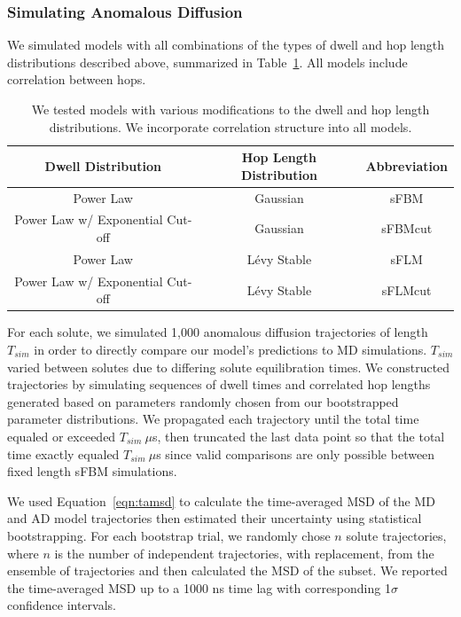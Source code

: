 \documentclass[aps,pre,preprint,groupedaddress]{revtex4-2}
\begin{document}
  \subsubsection*{Simulating Anomalous Diffusion}

  We simulated models with all combinations of the types of dwell and hop length
  distributions described above, summarized in Table~\ref{table:anomalous_models}.
  All models include correlation between hops.

  \begin{table}[!htb]
	  \centering
	  \begin{tabular}{|c|c|c|}
	  \hline
	  Dwell Distribution                & Hop Length Distribution & Abbreviation \\
	  \hline
      Power Law                         & Gaussian                & sFBM         \\
      Power Law w/ Exponential Cut-off  & Gaussian                & sFBMcut      \\
      Power Law                         & L\'evy Stable           & sFLM         \\
      Power Law w/ Exponential Cut-off  & L\'evy Stable           & sFLMcut      \\
	  \hline
	  \end{tabular}
	  \caption{We tested models with various modifications to the dwell and hop
	  length distributions. We incorporate correlation structure into all models.}\label{table:anomalous_models}
 \end{table}

  For each solute, we simulated 1,000 anomalous diffusion trajectories of length
  $T_{sim}$ in order to directly compare our model's predictions to MD simulations.
  $T_{sim}$ varied between solutes due to differing solute equilibration times. We constructed 
  trajectories by simulating sequences of dwell times and correlated hop lengths
  generated based on parameters randomly chosen from our bootstrapped parameter 
  distributions. We propagated each trajectory until the total time equaled or 
  exceeded $T_{sim}~ \mu$s, then truncated the last data point so that the total 
  time exactly equaled $T_{sim}~ \mu$s since valid comparisons are only possible 
  between fixed length sFBM simulations. 
  
  We used Equation~\ref{eqn:tamsd} to calculate the time-averaged MSD of the MD
  and AD model trajectories then estimated their uncertainty using statistical 
  bootstrapping. For each bootstrap trial, we randomly chose $n$ solute trajectories,
  where $n$ is the number of independent trajectories, with replacement, from the 
  ensemble of trajectories and then calculated the MSD of the subset. We reported 
  the time-averaged MSD up to a 1000 ns time lag with corresponding 1$\sigma$ confidence
  intervals. 
\end{document}
